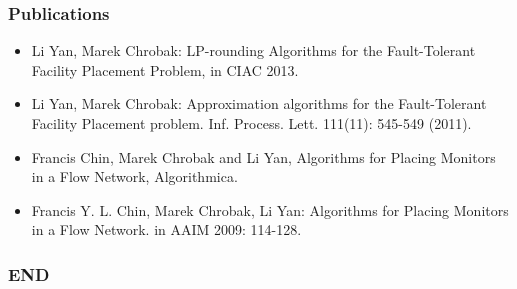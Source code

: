 \documentclass[handout, hyperref, xcolor=dvipsnames]{beamer}
\begin{document}
\begin{frame}
  \frametitle{Publications}
  \begin{itemize}
  \item Li Yan, Marek Chrobak: LP-rounding Algorithms for the
    Fault-Tolerant Facility Placement Problem, in CIAC 2013.
  \item Li Yan, Marek Chrobak: Approximation algorithms
    for the Fault-Tolerant Facility Placement
    problem. Inf. Process. Lett. 111(11): 545-549 (2011).
  \item Francis Chin, Marek Chrobak and Li Yan, Algorithms for Placing
    Monitors in a Flow Network, Algorithmica.
  \item Francis Y. L. Chin, Marek Chrobak, Li Yan: Algorithms for Placing Monitors in a Flow Network. in AAIM 2009: 114-128.
  \end{itemize}
\end{frame}

\begin{frame}
  \frametitle{END}
\end{frame}
\end{document}
